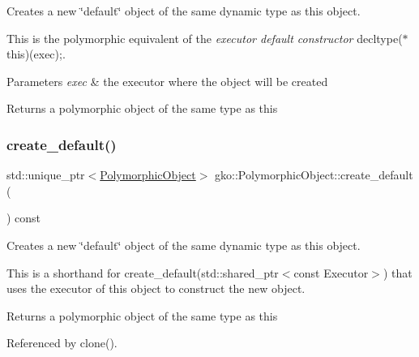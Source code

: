 Creates a new \char`\"{}default\char`\"{} object of the same dynamic type as this object. 

This is the polymorphic equivalent of the {\itshape executor default constructor} {\ttfamily decltype($\ast$this)(exec);}.


\begin{DoxyParams}{Parameters}
{\em exec} & the executor where the object will be created\\
\hline
\end{DoxyParams}
\begin{DoxyReturn}{Returns}
a polymorphic object of the same type as this 
\end{DoxyReturn}
\mbox{\label{classgko_1_1PolymorphicObject_a4f39c32375e3887fd4d7a9f02af42ca7}} 
\subsubsection{\texorpdfstring{create\+\_\+default()}{create\_default()}\hspace{0.1cm}{\footnotesize\ttfamily [2/2]}}
{\footnotesize\ttfamily std\+::unique\+\_\+ptr$<$\hyperlink{classgko_1_1PolymorphicObject}{Polymorphic\+Object}$>$ gko\+::\+Polymorphic\+Object\+::create\+\_\+default (\begin{DoxyParamCaption}{ }\end{DoxyParamCaption}) const\hspace{0.3cm}{\ttfamily [inline]}}



Creates a new \char`\"{}default\char`\"{} object of the same dynamic type as this object. 

This is a shorthand for create\+\_\+default(std\+::shared\+\_\+ptr$<$const Executor$>$) that uses the executor of this object to construct the new object.

\begin{DoxyReturn}{Returns}
a polymorphic object of the same type as this 
\end{DoxyReturn}


Referenced by clone().

\mbox{\label{classgko_1_1PolymorphicObject_ab40586bff071b7f11c2cf6b5cbf598eb}} 

